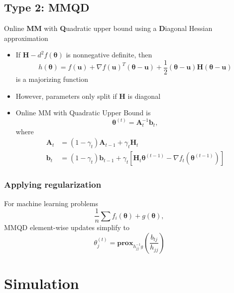 \documentclass{beamer}
\newcommand{\iter}[2]{#1^{(#2)}}
\begin{document}
\subsection{Type 2: MMQD}
\begin{frame}
  Online \textbf{MM} with \textbf{Q}uadratic upper bound using a \textbf{D}iagonal Hessian approximation
\end{frame}
\begin{frame}
  \begin{itemize}
    \item If $\bm H - d^2 f(\bm\theta)$ is nonnegative definite, then
    $$h(\bm\theta) = f(\bm u) + \nabla f(\bm u)^T(\bm\theta - \bm u) + \frac{1}{2}(\bm\theta - \bm u)\bm H(\bm\theta - \bm u)$$
    is a majorizing function
    \item However, parameters only split if $\bm H$ is diagonal
  \end{itemize}
\end{frame}
\begin{frame}
  \begin{itemize}
    \item Online MM with Quadratic Upper Bound is
    $$\iter{\bm\theta}{t} = \bm A_t^{-1}\bm b_t,$$
    where
    $$\begin{aligned}
      \bm A_t &= (1 - \gamma_t)\bm A_{t-1} + \gamma_t \bm H_t \\
      \bm b_t &= (1 - \gamma_t)\bm b_{t-1} + \gamma_t[\bm H_t\iter{\bm\theta}{t-1} - \nabla f_t(\iter{\bm\theta}{t-1})]
      \end{aligned}$$
  \end{itemize}
\end{frame}
\begin{frame}
  \frametitle{Applying regularization}
  For machine learning problems
    $$\frac{1}{n}\sum f_i(\bm\theta) + g(\bm\theta),$$
    MMQD element-wise updates simplify to
    $$\iter{\theta_j}{t} = \mathbf{prox}_{h_{jj}^{-1}g}\left(\frac{b_{tj}}{h_{jj}}\right)$$
\end{frame}

\section{Simulation}
\end{document}
